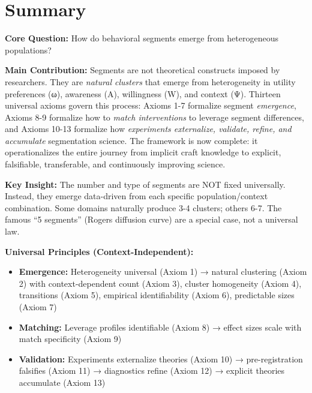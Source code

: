 \vspace{1em}

\section{Summary}
\label{sec:ba-summary}

\begin{tcolorbox}[colback=green!10!white, colframe=green!75!black,
    title=\textbf{Appendix BA: Summary}]

\textbf{Core Question:} How do behavioral segments emerge from heterogeneous populations?

\textbf{Main Contribution:}
Segments are not theoretical constructs imposed by researchers. They are
\textit{natural clusters} that emerge from heterogeneity in utility preferences (ω),
awareness (A), willingness (W), and context (Ψ). Thirteen universal axioms govern
this process: Axioms 1-7 formalize segment \textit{emergence}, Axioms 8-9 formalize how to
\textit{match interventions} to leverage segment differences, and Axioms 10-13 formalize how
\textit{experiments externalize, validate, refine, and accumulate} segmentation science.
The framework is now complete: it operationalizes the entire journey from implicit craft knowledge
to explicit, falsifiable, transferable, and continuously improving science.

\textbf{Key Insight:}
The number and type of segments are NOT fixed universally. Instead, they
emerge data-driven from each specific population/context combination. Some
domains naturally produce 3-4 clusters; others 6-7. The famous ``5 segments''
(Rogers diffusion curve) are a special case, not a universal law.

\textbf{Universal Principles (Context-Independent):}
\begin{itemize}[nosep]
\item \textbf{Emergence:} Heterogeneity universal (Axiom 1) → natural clustering (Axiom 2) with context-dependent count (Axiom 3), cluster homogeneity (Axiom 4), transitions (Axiom 5), empirical identifiability (Axiom 6), predictable sizes (Axiom 7)
\item \textbf{Matching:} Leverage profiles identifiable (Axiom 8) → effect sizes scale with match specificity (Axiom 9)
\item \textbf{Validation:} Experiments externalize theories (Axiom 10) → pre-registration falsifies (Axiom 11) → diagnostics refine (Axiom 12) → explicit theories accumulate (Axiom 13)
\end{itemize}


\end{tcolorbox}
